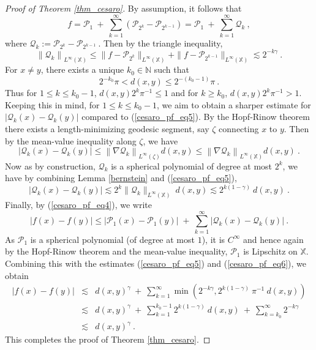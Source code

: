 \documentclass[12pt]{amsart}
\theoremstyle{definition}
\newcommand{\N}{\mathbb N}%
\newcommand{\X}{\mathbb X}%
\numberwithin{equation}{section}
\begin{document}
\begin{proof}[Proof of Theorem \ref{thm_cesaro}]
By assumption, it follows that
\begin{equation} \label{cesaro_pf_eq4}
f=\mathcal{P}_1 \:+\:\sum_{k=1}^\infty \left(\mathcal{P}_{2^k}-\mathcal{P}_{2^{k-1}}\right)= \mathcal{P}_1 \:+\:\sum_{k=1}^\infty \mathcal{Q}_k\:,
\end{equation} 
where $\mathcal{Q}_k:=\mathcal{P}_{2^k}-\mathcal{P}_{2^{k-1}}\:.$ Then by the triangle inequality,
\begin{equation} \label{cesaro_pf_eq5}
\left\|\mathcal{Q}_k\right\|_{L^\infty(\X)} \le \|f-\mathcal{P}_{2^k}\|_{L^\infty(\X)} + \|f-\mathcal{P}_{2^{k-1}}\|_{L^\infty(\X)} \lesssim 2^{-k\gamma}\:.
\end{equation}
For $x \ne y$, there exists a unique $k_0 \in \N$ such that
\begin{equation*}
2^{-k_0} \pi < d(x,y) \le 2^{-(k_0-1)} \pi\:.
\end{equation*}
Thus for $1 \le k \le k_0-1$, $d(x,y)2^k \pi^{-1} \le 1$ and for $k \ge k_0$, $d(x,y)2^k \pi^{-1} > 1$. Keeping this in mind, for $1 \le k \le k_0-1$, we aim to obtain a sharper estimate for $|\mathcal{Q}_k(x) - \mathcal{Q}_k(y)|$ compared to (\ref{cesaro_pf_eq5}). By the Hopf-Rinow theorem there exists a length-minimizing geodesic segment, say $\zeta$ connecting $x$ to $y$. Then by the mean-value inequality along $\zeta$, we have
\begin{equation*}
|\mathcal{Q}_k(x) - \mathcal{Q}_k(y)| \le \left\|\nabla \mathcal{Q}_k \right\|_{L^\infty(\zeta)} d(x,y) \le \left\|\nabla \mathcal{Q}_k \right\|_{L^\infty(\X)} d(x,y) \:.
\end{equation*}
Now as by construction, $\mathcal{Q}_k$ is a spherical polynomial of degree at most $2^k$, we have by combining Lemma \ref{bernstein} and (\ref{cesaro_pf_eq5}),
\begin{equation} \label{cesaro_pf_eq6}
|\mathcal{Q}_k(x) - \mathcal{Q}_k(y)| \lesssim  2^k \|\mathcal{Q}_k\|_{L^\infty(\X)} \:d(x,y) \lesssim 2^{k(1-\gamma)}\:d(x,y)\:.
\end{equation}
Finally, by (\ref{cesaro_pf_eq4}), we write
\begin{equation*}
|f(x)-f(y)| \le \left|\mathcal{P}_1(x)-\mathcal{P}_1(y)\right|\;+\:\sum_{k=1}^\infty \left|\mathcal{Q}_k(x)-\mathcal{Q}_k(y)\right|\:.
\end{equation*}
As $\mathcal{P}_1$ is a spherical polynomial (of degree at most $1$), it is $C^\infty$ and hence again by the Hopf-Rinow theorem and the mean-value inequality, $\mathcal{P}_1$ is Lipschitz on $\X$. Combining this with the estimates (\ref{cesaro_pf_eq5}) and (\ref{cesaro_pf_eq6}), we obtain
\begin{eqnarray*}
|f(x)-f(y)| & \lesssim & d(x,y)^\gamma \:+\: \sum_{k=1}^\infty \min\left(2^{-k\gamma},2^{k(1-\gamma)}\:\pi^{-1}\:d(x,y)\right)\\
&\lesssim& d(x,y)^\gamma \:+\: \sum_{k=1}^{k_0-1} 2^{k(1-\gamma)}\:d(x,y)\:+\: \sum_{k=k_0}^\infty 2^{-k\gamma}\\
&\lesssim &   d(x,y)^\gamma\:.
\end{eqnarray*}
This completes the proof of Theorem \ref{thm_cesaro}.
\end{proof}
\end{document}
